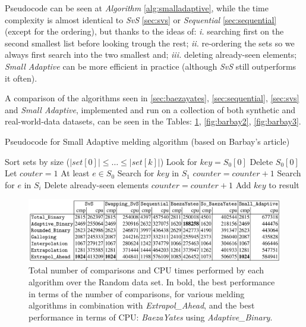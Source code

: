 Pseudocode can be seen at \textit{Algorithm} \ref{alg:smalladaptive}, while the time complexity is almost identical to \textit{SvS} \ref{sec:svs} or \textit{Sequential} \ref{sec:sequential} (except for the ordering), but thanks to the ideas of: \textit{i.} searching first on the second smallest list before looking trough the rest; \textit{ii.} re-ordering the sets so we always first search into the two smallest and; \textit{iii.} deleting already-seen elements; \textit{Small Adaptive} can be more efficient in practice (although \textit{SvS} still outperforms it often). 

A comparison of the algorithms seen in \ref{sec:baezayates}, \ref{sec:sequential}, \ref{sec:svs} and \textit{Small Adaptive}, implemented and run on a collection of both synthetic and real-world-data datasets, can be seen in the Tables: \ref{fig:barbay1}, \ref{fig:barbay2}, \ref{fig:barbay3}.

\begin{algorithm}
    \captionsetup{labelsep=newline}
    \caption{Pseudocode for Small Adaptive melding algorithm \label{alg:smalladaptive} (based on Barbay's article)}
    \begin{algorithmic}[1]
            \State Sort sets by size \big($\big|set[0]\big| \leq \ldots \leq \big|set[k]\big|$\big)
            \State Look for $key=S_0[0]$
            \State Delete $S_0[0]$
            \State Let $couter=1$ \Comment At least $e \in S_0$ 
            \State Search for $key$ in $S_1$
                \State $counter=counter+1$
                    \State Search for $e$ in $S_i$
                    \State Delete already-seen elements 
                        \State $counter=counter+1$
                    \EndIf
                \EndFor
            \EndIf
                \State Add $key$ to result
            \EndIf
        \EndWhile
    \end{algorithmic}
\end{algorithm}

\begin{figure}[h] 
    \begin{center}
        \includegraphics[width=.8\textwidth]{imgs/barbay_table3.png}
        \caption{Total number of comparisons and CPU times performed by each algorithm over the Random data set. In bold, the best
        performance in terms of the number of comparisons, for various melding algorithms in combination with \textit{Extrapol\_Ahead}, and
        the best performance in terms of CPU: \textit{BaezaYates} using \textit{Adaptive\_Binary}. \citep{barbay_ortiz} \label{fig:barbay1}}
    \end{center}
\end{figure}

